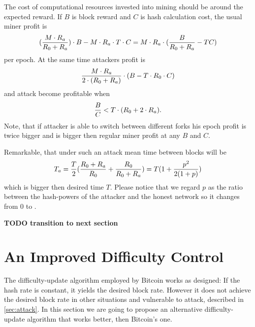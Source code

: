 \documentclass[number,preprint,review]{elsarticle}
\def\infinity{\rotatebox{90}{8}}
\begin{document}
The cost of computational resources invested into mining should be around the expected reward.
If \(B\) is block reward and \(C\) is hash calculation cost, the usual miner profit is
\begin{equation}
{({M\cdot R_a\over R_0+R_a})\cdot B-M\cdot R_a\cdot T\cdot C=M\cdot R_a\cdot ({B\over R_0+R_a}-TC)}
\end{equation}
per epoch.
At the same time attackers profit is
\begin{equation}
{{M\cdot R_a \over 2\cdot (R_0+R_a)}\cdot (B - T\cdot R_0\cdot C)}
\end{equation}
and attack become profitable when
\begin{equation}
{{B\over C} < T\cdot (R_0+2\cdot R_a)}.
\end{equation}
Note, that if attacker is able to switch between different forks his epoch profit is twice bigger and is bigger then regular miner profit at any \(B\) and \(C\).


Remarkable, that under such an attack mean time between blocks will be
\begin{equation}
\label{eq:ati}
{T_a={T\over 2}({R_0+R_a\over R_0} + {R_0\over R_0+R_a})=T(1 + {p^2\over 2(1+p)})}
\end{equation}
which is bigger then desired time \(T\).
Please notice that we regard \(p\) as the ratio between the hash-powers of the attacker and the honest network so it changes from 0 to \infinity.

\textbf{TODO transition to next section}

\section{An Improved Difficulty Control}
\label{sec:improved}

The difficulty-update algorithm employed by Bitcoin works as designed: If the hash rate is constant, it yields the desired block rate.
However it does not achieve the desired block rate in other situations and vulnerable to attack, described in \ref{sec:attack}.
In this section we are going to propose an alternative difficulty-update algorithm that works better, then Bitcoin's one.
\end{document}
